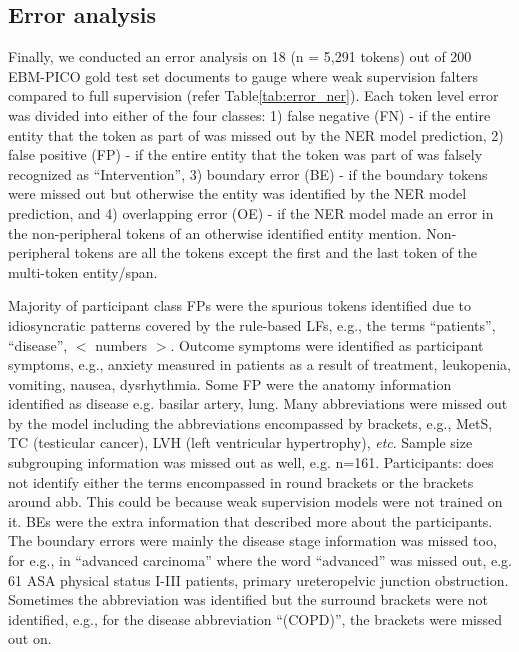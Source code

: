 \documentclass[10.7pt,]{article}
\begin{document}
\subsection{Error analysis}\label{error_an}
%
Finally, we conducted an error analysis on 18 (n = 5,291 tokens) out of 200 EBM-PICO gold test set documents to gauge where weak supervision falters compared to full supervision (refer Table\ref{tab:error_ner}).
Each token level error was divided into either of the four classes: 1) false negative (FN) - if the entire entity that the token as part of was missed out by the NER model prediction, 2) false positive (FP) - if the entire entity that the token was part of was falsely recognized as ``Intervention'', 3) boundary error (BE) - if the boundary tokens were missed out but otherwise the entity was identified by the NER model prediction, and 4) overlapping error (OE) - if the NER model made an error in the non-peripheral tokens of an otherwise identified entity mention.
Non-peripheral tokens are all the tokens except the first and the last token of the multi-token entity/span.

Majority of participant class FPs were the spurious tokens identified due to idiosyncratic patterns covered by the rule-based LFs, e.g., the terms ``patients'', ``disease'', $<$ numbers $>$.
Outcome symptoms were identified as participant symptoms, e.g., anxiety measured in patients as a result of treatment, leukopenia, vomiting, nausea, dysrhythmia.
Some FP were the anatomy information identified as disease e.g. basilar artery, lung.
Many abbreviations were missed out by the model including the abbreviations encompassed by brackets, e.g., MetS, TC (testicular cancer), LVH (left ventricular hypertrophy), \textit{etc}.
Sample size subgrouping information was missed out as well, e.g. n=161.
Participants: does not identify either the terms encompassed in round brackets or the brackets around abb. This could be because weak supervision models were not trained on it.
BEs were the extra information that described more about the participants.
The boundary errors were mainly the disease stage information was missed too, for e.g., in ``advanced carcinoma'' where the word ``advanced'' was missed out, e.g. 61 ASA physical status I-III patients, primary ureteropelvic junction obstruction.
Sometimes the abbreviation was identified but the surround brackets were not identified, e.g., for the disease abbreviation ``(COPD)'', the brackets were missed out on.
\end{document}
